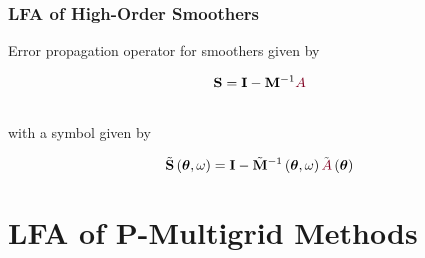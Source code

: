 \documentclass{beamer}
\begin{document}
\begin{frame}
\begin{center}
\frametitle{LFA of High-Order Smoothers}

Error propagation operator for smoothers given by

\vspace{-4mm}

\begin{equation}
\mathbf{S} = \mathbf{I} - \mathbf{M}^{-1} {\color{burgundy}A}
\end{equation}

~\\

with a symbol given by

\vspace{-4mm}

\begin{equation}
\tilde{\mathbf{S}} \left( \boldsymbol{\theta}, \omega \right) = \mathbf{I} - \tilde{\mathbf{M}}^{-1} \left( \boldsymbol{\theta}, \omega \right) \tilde{{\color{burgundy}A}} \left( \boldsymbol{\theta} \right)
\end{equation}

\end{center}
\end{frame}

\section{LFA of P-Multigrid Methods}
\end{document}
